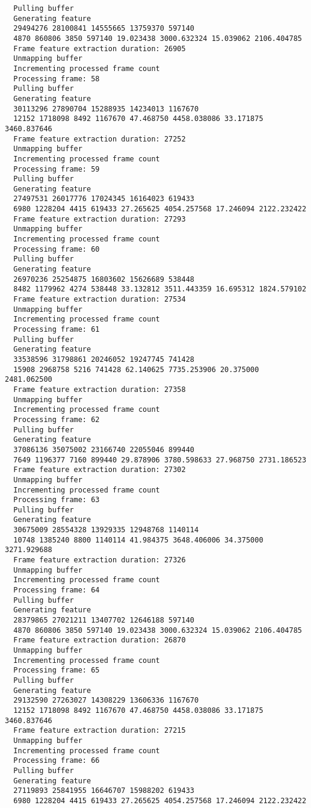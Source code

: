 \documentclass[12pt,oneside]{book}
\begin{document}
\begin{lstlisting}
  Pulling buffer
  Generating feature
  29494276 28100841 14555665 13759370 597140
  4870 860806 3850 597140 19.023438 3000.632324 15.039062 2106.404785
  Frame feature extraction duration: 26905
  Unmapping buffer
  Incrementing processed frame count
  Processing frame: 58
  Pulling buffer
  Generating feature
  30113296 27890704 15288935 14234013 1167670
  12152 1718098 8492 1167670 47.468750 4458.038086 33.171875 3460.837646
  Frame feature extraction duration: 27252
  Unmapping buffer
  Incrementing processed frame count
  Processing frame: 59
  Pulling buffer
  Generating feature
  27497531 26017776 17024345 16164023 619433
  6980 1228204 4415 619433 27.265625 4054.257568 17.246094 2122.232422
  Frame feature extraction duration: 27293
  Unmapping buffer
  Incrementing processed frame count
  Processing frame: 60
  Pulling buffer
  Generating feature
  26970236 25254875 16803602 15626689 538448
  8482 1179962 4274 538448 33.132812 3511.443359 16.695312 1824.579102
  Frame feature extraction duration: 27534
  Unmapping buffer
  Incrementing processed frame count
  Processing frame: 61
  Pulling buffer
  Generating feature
  33538596 31798861 20246052 19247745 741428
  15908 2968758 5216 741428 62.140625 7735.253906 20.375000 2481.062500
  Frame feature extraction duration: 27358
  Unmapping buffer
  Incrementing processed frame count
  Processing frame: 62
  Pulling buffer
  Generating feature
  37086136 35075002 23166740 22055046 899440
  7649 1196377 7160 899440 29.878906 3780.598633 27.968750 2731.186523
  Frame feature extraction duration: 27302
  Unmapping buffer
  Incrementing processed frame count
  Processing frame: 63
  Pulling buffer
  Generating feature
  30675009 28554328 13929335 12948768 1140114
  10748 1385240 8800 1140114 41.984375 3648.406006 34.375000 3271.929688
  Frame feature extraction duration: 27326
  Unmapping buffer
  Incrementing processed frame count
  Processing frame: 64
  Pulling buffer
  Generating feature
  28379865 27021211 13407702 12646188 597140
  4870 860806 3850 597140 19.023438 3000.632324 15.039062 2106.404785
  Frame feature extraction duration: 26870
  Unmapping buffer
  Incrementing processed frame count
  Processing frame: 65
  Pulling buffer
  Generating feature
  29132590 27263027 14308229 13606336 1167670
  12152 1718098 8492 1167670 47.468750 4458.038086 33.171875 3460.837646
  Frame feature extraction duration: 27215
  Unmapping buffer
  Incrementing processed frame count
  Processing frame: 66
  Pulling buffer
  Generating feature
  27119893 25841955 16646707 15988202 619433
  6980 1228204 4415 619433 27.265625 4054.257568 17.246094 2122.232422

\end{lstlisting}
\end{document}
